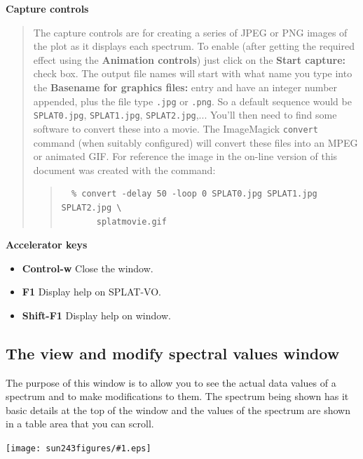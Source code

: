 \documentclass[twoside,11pt]{article}
\newcommand{\htmladdimg}[1]{}
\newcommand{\latexhtml}[2]{#1}
\renewcommand{\_}{\texttt{\symbol{95}}}
\newcommand{\SPLAT}{\textsf{SPLAT-VO}}
\newcommand{\mainfigure}[1]
{\begin{center}
 \latexhtml{\texttt{[image: sun243\_figures/\#1.eps]}}{\htmladdimg{#1.gif}}
 \end{center}
}
\newcommand{\labelitem}[1]{\textbf{#1}}
\newcommand{\hitext}[1]{\texttt{#1}}
\newcommand{\subheading}[1]{\textbf{\large{#1}}}
\begin{document}
\subheading{Capture controls}
\begin{quote}
 The capture controls are for creating a series of JPEG or PNG images of the
 plot as it displays each spectrum. To enable (after getting the
 required effect using the \labelitem{Animation controls}) just click
 on the \labelitem{Start capture:} check box. The output file names
 will start with what name you type into the \labelitem{Basename for
 graphics files:} entry and have an integer number appended, plus the file type
 \hitext{.jpg} or \hitext{.png}. So a default sequence would be
 \hitext{SPLAT0.jpg}, \hitext{SPLAT1.jpg}, \hitext{SPLAT2.jpg},...
 You'll then need to find some software to convert these into a movie.
 The ImageMagick \hitext{convert} command (when suitably configured)
 will convert these files into an MPEG or animated GIF.
 \latexhtml{For reference the image in the on-line version of this
 document was created with the command:}{The image below was created
 with the command (note that the images were also scaled):}
 \begin{quote}
 \begin{verbatim}
  % convert -delay 50 -loop 0 SPLAT0.jpg SPLAT1.jpg SPLAT2.jpg \
       splatmovie.gif
 \end{verbatim}
 \end{quote}
 \htmladdimg{splatmovie.gif}
\end{quote}

\subheading{Accelerator keys}

\begin{itemize}
\item \labelitem{Control-w} Close the window.
\item \labelitem{F1} Display help on \SPLAT.     
\item \labelitem{Shift-F1} Display help on window.
\end{itemize}

\newpage
\subsection{The view and modify spectral values window}

The purpose of this window is to allow you to see the actual data
values of a spectrum and to make modifications to them.
The spectrum being shown has it basic details at the top of the window
and the values of the spectrum are shown in a table area that you can
scroll.

\mainfigure{viewwindow}
\end{document}
